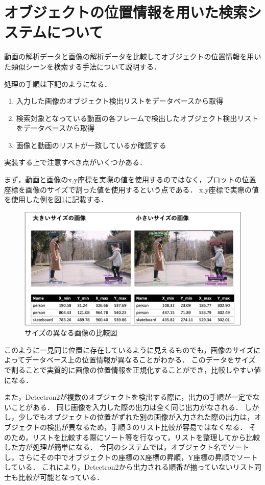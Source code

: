 \documentclass[a4j,12pt,dvipdfmx]{jreport}
\begin{document}
\section{オブジェクトの位置情報を用いた検索システムについて}
動画の解析データと画像の解析データを比較してオブジェクトの位置情報を用いた類似シーンを検索する手法について説明する．

処理の手順は下記のようになる．
\begin{enumerate}
  \item 入力した画像のオブジェクト検出リストをデータベースから取得
  \item 検索対象となっている動画の各フレームで検出したオブジェクト検出リストをデータベースから取得
  \item 画像と動画のリストが一致しているか確認する
\end{enumerate}

実装する上で注意すべき点がいくつかある．

まず，動画と画像のx,y座標を実際の値を使用するのではなく，プロットの位置座標を画像のサイズで割った値を使用するという点である．
x,y座標で実際の値を使用した例を図\ref{fig:compare}に記載する．

\begin{figure}[H]
  \centering
  \includegraphics[width=13cm]{image/compare.png}
  \caption{サイズの異なる画像の比較図}
  \label{fig:compare}
\end{figure}

このように一見同じ位置に存在しているように見えるものでも，画像のサイズによってデータベース上の位置情報が異なることがわかる．
このデータをサイズで割ることで実質的に画像の位置情報を正規化することができ，比較しやすい値になる．

また，Detectron2が複数のオブジェクトを検出する際に，出力の手順が一定でないことがある．
同じ画像を入力した際の出力は全く同じ出力がなされる．
しかし，少しでもオブジェクトの位置がずれた別の画像が入力された際の出力は，オブジェクトの検出が異なるため，手順３のリスト比較が容易ではなくなる．
そのため，リストを比較する際にソート等を行なって，リストを整理してから比較した方が処理が簡単になる．
今回のシステムでは，オブジェクト名でソートし，さらにその中でオブジェクトの座標のX座標の昇順，Y座標の昇順でソートしている．
これにより，Detectron2から出力される順番が揃っていないリスト同士も比較が可能となっている．
\end{document}
